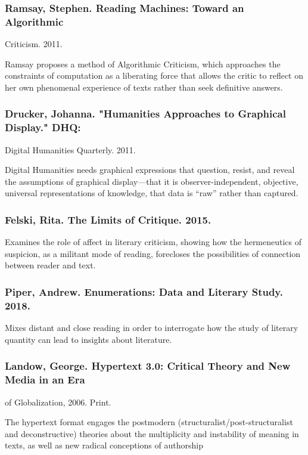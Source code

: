 \documentclass[11pt]{article}
\begin{document}
\subsubsection{Ramsay, Stephen. Reading Machines: Toward an Algorithmic}
\label{sec:orgbd7e823}
Criticism. 2011.

Ramsay proposes a method of Algorithmic Criticism, which approaches
the constraints of computation as a liberating force that allows the
critic to reflect on her own phenomenal experience of texts rather
than seek definitive answers.

\subsubsection{Drucker, Johanna. "Humanities Approaches to Graphical Display." DHQ:}
\label{sec:org0f2cc72}
Digital Humanities Quarterly. 2011.

Digital Humanities needs graphical expressions that question, resist,
and reveal the assumptions of graphical display---that it is
observer-independent, objective, universal representations of
knowledge, that data is “raw” rather than captured.

\subsubsection{Felski, Rita. The Limits of Critique. 2015.}
\label{sec:org330890d}

Examines the role of affect in literary criticism, showing how the
hermeneutics of suspicion, as a militant mode of reading, forecloses
the possibilities of connection between reader and text.  

\subsubsection{Piper, Andrew. Enumerations: Data and Literary Study. 2018.}
\label{sec:org94d74c3}

Mixes distant and close reading in order to interrogate how the study
of literary quantity can lead to insights about literature.

\subsubsection{Landow, George. Hypertext 3.0: Critical Theory and New Media in an Era}
\label{sec:org165acc8}
of Globalization, 2006. Print.

The hypertext format engages the postmodern
(structuralist/post-structuralist and deconstructive) theories about
the multiplicity and instability of meaning in texts, as well as new
radical conceptions of authorship
\end{document}
